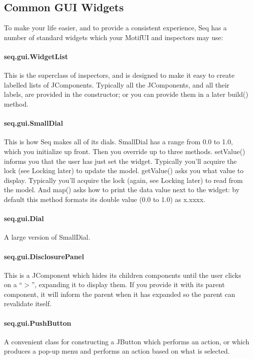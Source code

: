 \documentclass[twoside,10pt]{article}
\begin{document}
\subsection{Common GUI Widgets}

To make your life easier, and to provide a consistent experience, Seq has a number of standard widgets which your MotifUI and inspectors may use:

\paragraph{seq.gui.WidgetList}  This is the superclass of inspectors, and is designed to make it easy to create labelled lists of JComponents.  Typically all the JComponents, and all their labels, are provided in the constructor; or you can provide them in a later {\sf build()} method.

\paragraph{seq.gui.SmallDial}  This is how Seq makes all of its dials.  SmallDial has a range from 0.0 to 1.0, which you initialize up front.  Then you override up to three methods.  {\sf setValue()} informs you that the user has just set the widget.  Typically you'll acquire the lock (see Locking later) to update the model.  {\sf getValue()} asks you what value to display.  Typically you'll acquire the lock (again, see Locking later) to read from the model.  And {\sf map()} asks how to print the data value next to the widget: by default this method formats its double value (0.0 to 1.0) as x.xxxx.

\paragraph{seq.gui.Dial}  A large version of SmallDial.

\paragraph{seq.gui.DisclosurePanel}  This is a JComponent which hides its children components until the user clicks on a ``\(>\)'', expanding it to display them.  If you provide it with its parent component, it will inform the parent when it has expanded so the parent can revalidate itself.

\paragraph{seq.gui.PushButton}  A convenient class for constructing a JButton which performs an action, or which produces a pop-up menu and performs an action based on what is selected.
\end{document}
